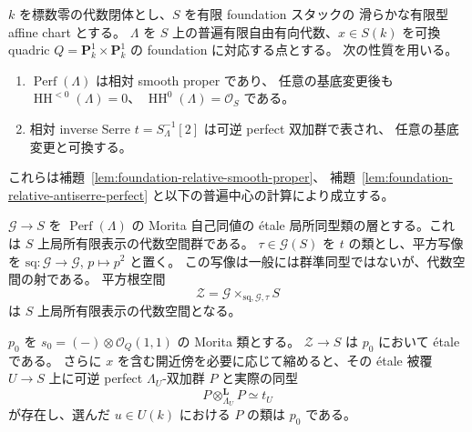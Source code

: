 \begin{proposition}
\label{prop:quadric-etale-morita-root}
$k$ を標数零の代数閉体とし、$S$ を有限 foundation スタックの
滑らかな有限型 affine chart とする。
$\Lambda$ を $S$ 上の普遍有限自由有向代数、$x\in S(k)$ を可換 quadric
$Q=\mathbf P^1_k\times\mathbf P^1_k$ の foundation に対応する点とする。
次の性質を用いる。
\begin{enumerate}
\item $\operatorname{Perf}(\Lambda)$ は相対 smooth proper であり、
  任意の基底変更後も $\operatorname{HH}^{<0}(\Lambda)=0$、
  $\operatorname{HH}^{0}(\Lambda)=\mathcal O_S$ である。
\item 相対 inverse Serre $t=S_{\Lambda}^{-1}[2]$ は可逆 perfect 双加群で表され、
  任意の基底変更と可換する。
\end{enumerate}
これらは補題~\ref{lem:foundation-relative-smooth-proper}、
補題~\ref{lem:foundation-relative-antiserre-perfect} と以下の普遍中心の計算により成立する。

$\mathcal G\to S$ を $\operatorname{Perf}(\Lambda)$ の Morita 自己同値の
\'etale 局所同型類の層とする。これは $S$ 上局所有限表示の代数空間群である。
$\tau\in\mathcal G(S)$ を $t$ の類とし、平方写像を
$\mathrm{sq}:\mathcal G\to\mathcal G$, $p\mapsto p^2$ と置く。
この写像は一般には群準同型ではないが、代数空間の射である。
平方根空間
\[
 \mathcal Z=\mathcal G\mathbin{\times}_{\mathrm{sq},\mathcal G,\tau}S
\]
は $S$ 上局所有限表示の代数空間となる。

$p_0$ を $s_0=(-)\otimes\mathcal O_Q(1,1)$ の Morita 類とする。
$\mathcal Z\to S$ は $p_0$ において \'etale である。
さらに $x$ を含む開近傍を必要に応じて縮めると、その \'etale 被覆
$U\to S$ 上に可逆 perfect $\Lambda_U$-双加群 $P$ と実際の同型
\[
 P\otimes^{\mathbf L}_{\Lambda_U}P\simeq t_U
\]
が存在し、選んだ $u\in U(k)$ における $P$ の類は $p_0$ である。
\end{proposition}


